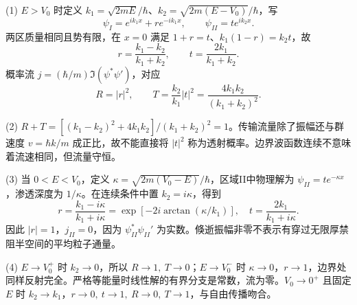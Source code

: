 (1) \(E>V_0\) 时定义 \(k_1=\sqrt{2mE}/\hbar\)、\(k_2=\sqrt{2m(E-V_0)}/\hbar\)，写
\[
\psi_I=e^{ik_1x}+r e^{-ik_1x},\qquad \psi_{II}=t e^{ik_2x}.
\]
两区质量相同且势有限，在 \(x=0\) 满足 \(1+r=t\)、\(k_1(1-r)=k_2t\)，故
\[
r=\frac{k_1-k_2}{k_1+k_2},\qquad t=\frac{2k_1}{k_1+k_2}.
\]
概率流 \(j=(\hbar/m)\Im(\psi^*\psi')\)，对应
\[
R=|r|^2,\qquad T=\frac{k_2}{k_1}|t|^2
=\frac{4k_1k_2}{(k_1+k_2)^2}.
\]

(2) \(R+T=[(k_1-k_2)^2+4k_1k_2]/(k_1+k_2)^2=1\)。传输流量除了振幅还与群速度 \(v=\hbar k/m\) 成正比，故不能直接将 \(|t|^2\) 称为透射概率。边界波函数连续不意味着流速相同，但流量守恒。

(3) 当 \(0<E<V_0\)，定义 \(\kappa=\sqrt{2m(V_0-E)}/\hbar\)，区域II中物理解为 \(\psi_{II}=t e^{-\kappa x}\)，渗透深度为 \(1/\kappa\)。在连续条件中置 \(k_2=i\kappa\)，得到
\[
r=\frac{k_1-i\kappa}{k_1+i\kappa}
=\exp[-2i\arctan(\kappa/k_1)],\quad t=\frac{2k_1}{k_1+i\kappa}.
\]
因此 \(|r|=1\)，\(j_{II}=0\)，因为 \(\psi_{II}^*\psi_{II}'\) 为实数。倏逝振幅非零不表示有穿过无限厚禁阻半空间的平均粒子通量。

(4) \(E\to V_0^+\) 时 \(k_2\to0\)，所以 \(R\to1,\ T\to0\)；\(E\to V_0^-\) 时 \(\kappa\to0\)，\(r\to1\)，边界处同样反射完全。严格等能量时线性解的有界分支是常数，流为零。\(V_0\to0^+\) 且固定 \(E\) 时 \(k_2\to k_1\)，\(r\to0,\ t\to1,\ R\to0,\ T\to1\)，与自由传播吻合。
